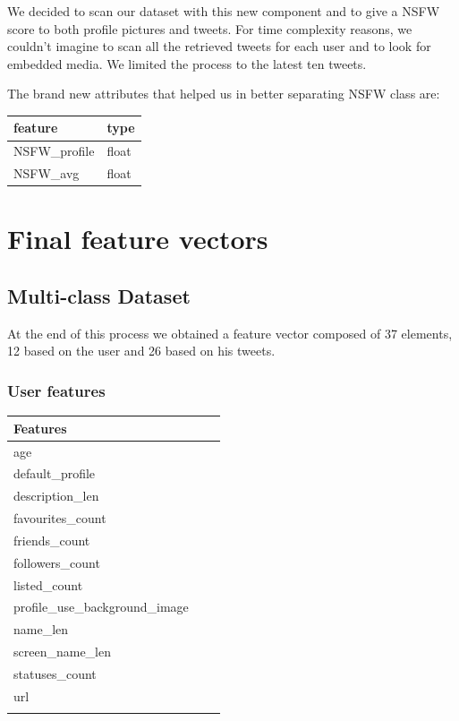 We decided to scan our dataset with this new component and to give a NSFW score to both profile pictures and tweets.
For time complexity reasons, we couldn't imagine to scan all the retrieved tweets for each user and to look for embedded media. We limited the process to the latest ten tweets.

The brand new attributes that helped us in better separating NSFW class are:
\small
\begin{center}
	\begin{tabular}{ll}
		\\feature&type\\
		\hline\hline
		NSFW\_profile&float\\
		NSFW\_avg&float\\\hline
	\end{tabular}
\end{center}
\normalsize

\section{Final feature vectors}
\label{sec:feature_vector}

\subsection{Multi-class Dataset}
At the end of this process we obtained a feature vector composed of 37 elements, 12 based on the user and 26 based on his tweets.

\subsubsection{User features}


\small
\begin{center}
	\begin{tabular}{lll}
		\textbf{Features}\\
		\hline\hline
		age\\
		default\_profile\\
		description\_len\\
		favourites\_count\\
		friends\_count\\
		followers\_count\\
		listed\_count\\
		profile\_use\_background\_image\\
		name\_len\\
		screen\_name\_len\\
		statuses\_count\\
		url\\
		\hline\\
		
	\end{tabular}
\end{center}
\normalsize

